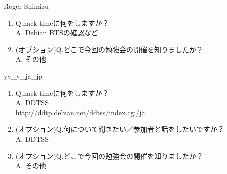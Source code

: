 \begin{prework}{ Roger Shimizu }
  \begin{enumerate}
  \item Q.hack timeに何をしますか？\\
    A. Debian BTSの確認など
  \item (オプション)Q.どこで今回の勉強会の開催を知りましたか？\\
    A. その他
  \end{enumerate}
\end{prework}


\begin{prework}{yy\_y\_ja\_jp}
  \begin{enumerate}
  \item Q.hack timeに何をしますか？\\
    A. DDTSS\\
    http://ddtp.debian.net/ddtss/index.cgi/ja
  \item (オプション)Q.何について聞きたい／参加者と話をしたいですか？\\
    A. DDTSS
  \item (オプション)Q.どこで今回の勉強会の開催を知りましたか？\\
    A. その他
  \end{enumerate}
\end{prework}


